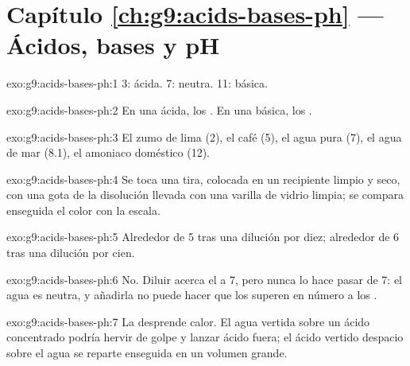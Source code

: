 \section*{Capítulo \ref{ch:g9:acids-bases-ph} --- Ácidos, bases y pH}

\begin{solution}{exo:g9:acids-bases-ph:1}
 3: ácida.  7: neutra.  11: básica.
\end{solution}

\begin{solution}{exo:g9:acids-bases-ph:2}
En una ácida, los  . En una básica, los  .
\end{solution}

\begin{solution}{exo:g9:acids-bases-ph:3}
El zumo de lima (2), el café (5), el agua pura (7), el agua de mar
(8.1), el amoniaco doméstico (12).
\end{solution}

\begin{solution}{exo:g9:acids-bases-ph:4}
Se toca una tira, colocada en un recipiente limpio y seco, con una gota
de la disolución llevada con una varilla de vidrio limpia; se compara
enseguida el color con la escala.
\end{solution}

\begin{solution}{exo:g9:acids-bases-ph:5}
Alrededor de 5 tras una dilución por diez; alrededor de 6 tras una
dilución por cien.
\end{solution}

\begin{solution}{exo:g9:acids-bases-ph:6}
No. Diluir acerca el  a 7, pero nunca lo hace pasar de 7: el agua es
neutra, y añadirla no puede hacer que los   superen en
número a los  .
\end{solution}

\begin{solution}{exo:g9:acids-bases-ph:7}
La  desprende calor. El agua vertida sobre un ácido concentrado
podría hervir de golpe y lanzar ácido fuera; el ácido vertido despacio
sobre el agua se reparte enseguida en un volumen grande.
\end{solution}

